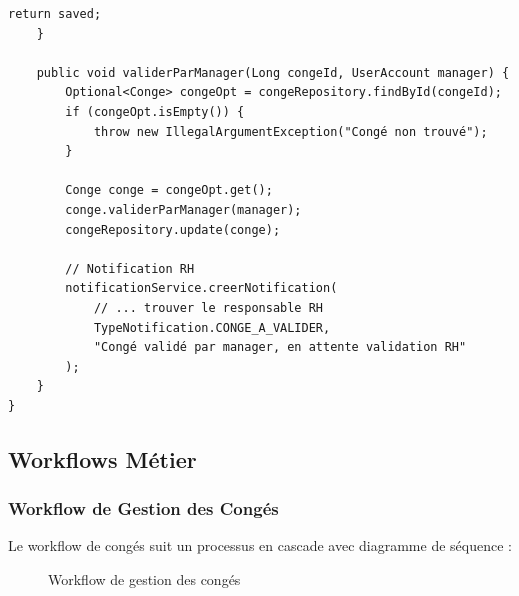\documentclass[12pt,a4paper,twoside]{report}
\begin{document}
\begin{lstlisting}[caption=Service EJB avec validation métier, label=lst:ejb-service]
        return saved;
    }
    
    public void validerParManager(Long congeId, UserAccount manager) {
        Optional<Conge> congeOpt = congeRepository.findById(congeId);
        if (congeOpt.isEmpty()) {
            throw new IllegalArgumentException("Congé non trouvé");
        }
        
        Conge conge = congeOpt.get();
        conge.validerParManager(manager);
        congeRepository.update(conge);
        
        // Notification RH
        notificationService.creerNotification(
            // ... trouver le responsable RH
            TypeNotification.CONGE_A_VALIDER,
            "Congé validé par manager, en attente validation RH"
        );
    }
}
\end{lstlisting}

\subsection{Workflows Métier}

\subsubsection{Workflow de Gestion des Congés}

Le workflow de congés suit un processus en cascade avec diagramme de séquence :

\begin{figure}[H]
\centering
{}
\caption{Workflow de gestion des congés}
\label{fig:workflow-conge}
\end{figure}
\end{document}
